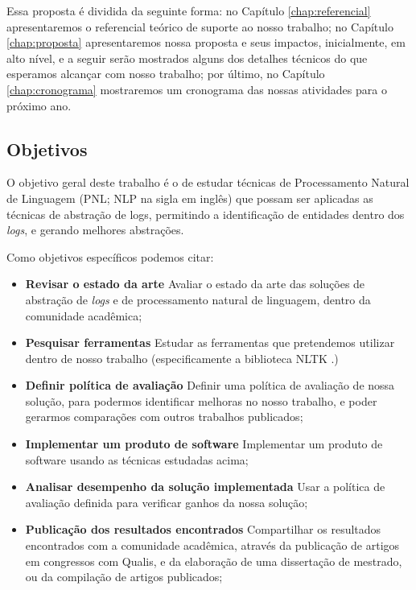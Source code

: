 \documentclass[
	12pt,				%
	openright,			%
	twoside,			%
	a4paper,			%
	english,			%
	french,				%
	spanish,			%
	brazil,				%
	]{abntex2}
\begin{document}
Essa proposta é dividida da seguinte forma: no Capítulo \ref{chap:referencial} apresentaremos o referencial teórico de suporte ao nosso trabalho; no Capítulo \ref{chap:proposta} apresentaremos nossa proposta e seus impactos, inicialmente, em alto nível, e a seguir serão mostrados alguns dos detalhes técnicos do que esperamos alcançar com nosso trabalho; por último, no Capítulo \ref{chap:cronograma} mostraremos um cronograma das nossas atividades para o próximo ano.

\subsection{Objetivos}

O objetivo geral deste trabalho é o de estudar técnicas de Processamento Natural de Linguagem (PNL; NLP na sigla em inglês) que possam ser aplicadas as técnicas de abstração de logs, permitindo a identificação de entidades dentro dos \emph{logs}, e gerando melhores abstrações.

Como objetivos específicos podemos citar:
\begin{itemize}
	\item{\textbf{Revisar o estado da arte}} Avaliar o estado da arte das soluções de abstração de \emph{logs} e de processamento natural de linguagem, dentro da comunidade acadêmica;

	\item{\textbf{Pesquisar ferramentas}} Estudar as ferramentas que pretendemos utilizar dentro de nosso trabalho (especificamente a biblioteca NLTK \cite{bird2009natural}.)
	
	\item{\textbf{Definir política de avaliação}} Definir uma política de avaliação de nossa solução, para podermos identificar melhoras no nosso trabalho, e poder gerarmos comparações com outros trabalhos publicados;
	
	\item{\textbf{Implementar um produto de software}} Implementar um produto de software usando as técnicas estudadas acima;
	
	\item{\textbf{Analisar desempenho da solução implementada}} Usar a política de avaliação definida para verificar ganhos da nossa solução;
	
	\item{\textbf{Publicação dos resultados encontrados}} Compartilhar os resultados encontrados com a comunidade acadêmica, através da publicação de artigos em congressos com Qualis, e  da elaboração de uma dissertação de mestrado, ou da compilação de artigos publicados;
	
\end{itemize}
\end{document}
